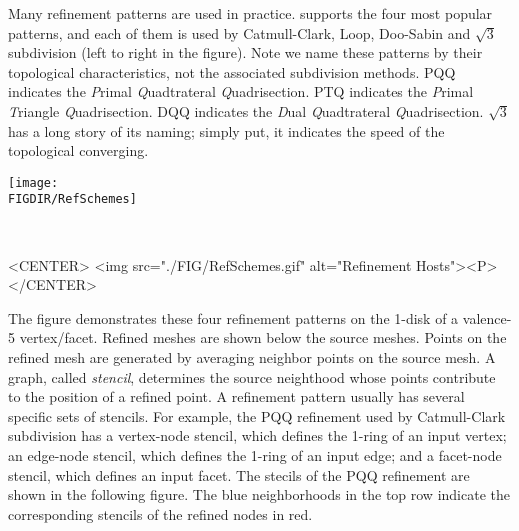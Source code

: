 Many refinement patterns are used in practice. 
 supports the four most popular 
patterns, and each of them is used by 
Catmull-Clark\cite{cgal:cc-rgbss-78}, Loop, Doo-Sabin 
and $\sqrt{3}$ subdivision (left to right in the 
figure). Note we name these patterns by their topological
characteristics, not the associated subdivision methods. 
PQQ indicates the \emph{P}rimal \emph{Q}uadtrateral \emph{Q}uadrisection. 
PTQ indicates the \emph{P}rimal \emph{T}riangle \emph{Q}uadrisection. 
DQQ indicates the \emph{D}ual \emph{Q}uadtrateral \emph{Q}uadrisection.
$\sqrt{3}$ has a long story of its naming; simply put, it 
indicates the speed of the topological converging.

\begin{ccTexOnly}
  \begin{center}
    \parbox{0.6\textwidth}{%
      \texttt{[image: \\FIGDIR/RefSchemes]}%
    }\\ \vspace{0.5cm}
  \end{center}
\end{ccTexOnly}

\begin{ccHtmlOnly}
  <CENTER>
     <img src="./FIG/RefSchemes.gif" alt="Refinement Hosts"><P>
  </CENTER>
\end{ccHtmlOnly}

The figure demonstrates these four refinement patterns on 
the 1-disk of a valence-5 vertex/facet.
Refined meshes are shown below the source meshes. 
Points on the refined mesh are generated by averaging
neighbor points on the source mesh. A graph, called \emph{stencil}, 
determines the source neighthood whose points contribute to the 
position of a refined point. A refinement pattern usually has 
several specific sets of stencils.
For example, the PQQ
refinement used by Catmull-Clark subdivision has a vertex-node stencil, 
which defines the 1-ring of an input vertex; an edge-node stencil, 
which defines the 1-ring of an input edge; and a facet-node stencil, 
which defines an input facet. The stecils of the PQQ refinement are
shown in the following figure. The blue neighborhoods in the 
top row indicate the corresponding stencils of the refined nodes 
in red. 


